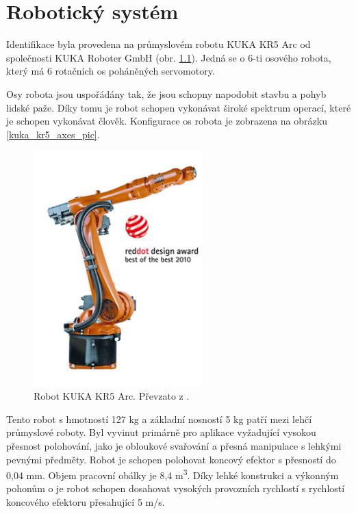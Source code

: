 
\chapter{Robotický systém}

Identifikace byla provedena na průmyslovém robotu KUKA KR5 Arc \cite{kuka_datasheet_url} od společnosti KUKA Roboter GmbH (obr. \ref{kuka_kr5_pic}). Jedná se o 6-ti osového robota, který má 6 rotačních os poháněných servomotory. 

Osy robota jsou uspořádány tak, že jsou schopny napodobit stavbu a pohyb lidské paže. Díky tomu je robot schopen vykonávat široké spektrum operací, které je schopen vykonávat člověk. Konfigurace os robota je zobrazena na obrázku \ref{kuka_kr5_axes_pic}.  

\begin{figure}[ht]
\includegraphics[width=0.58\textwidth]{PR_KR5_arc_02}
\caption{Robot KUKA KR5 Arc. Převzato z \cite{kuka_datasheet_url}.}
\label{kuka_kr5_pic}
\end{figure}

Tento robot s hmotností 127 kg a základní nosností 5 kg patří mezi lehčí průmyslové roboty. Byl vyvinut primárně pro aplikace vyžadující vysokou přesnost polohování, jako je obloukové svařování a přesná manipulace s lehkými pevnými předměty. Robot je schopen polohovat koncový efektor s přesností do 0,04 mm. Objem pracovní obálky je 8,4 \si{m^{3}}. Díky lehké konstrukci a výkonným pohonům o je robot schopen dosahovat vysokých provozních rychlostí s rychlostí koncového efektoru přesahující 5 \si{m/s}.  

